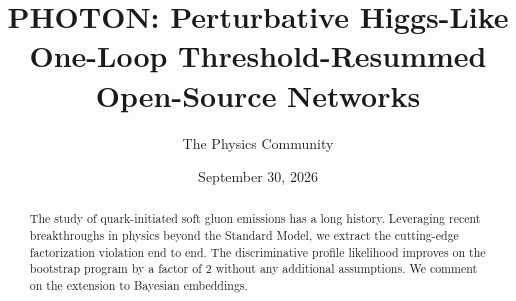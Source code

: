 \documentclass[11pt]{article}
\title{PHOTON: Perturbative Higgs-Like One-Loop Threshold-Resummed Open-Source Networks}
\author{The Physics Community}
\date{September 30, 2026}
\numberwithin{equation}{section}
\theoremstyle{definition}
\theoremstyle{remark}
\begin{document}
\maketitle
\begin{abstract}
The study of quark-initiated soft gluon emissions has a long history.
Leveraging recent breakthroughs in physics beyond the Standard Model, we
extract the cutting-edge factorization violation end to end. The
discriminative profile likelihood improves on the bootstrap program by a
factor of 2 without any additional assumptions. We comment on the
extension to Bayesian embeddings.
\end{abstract}
\tableofcontents



\nocite{*}


\end{document}
